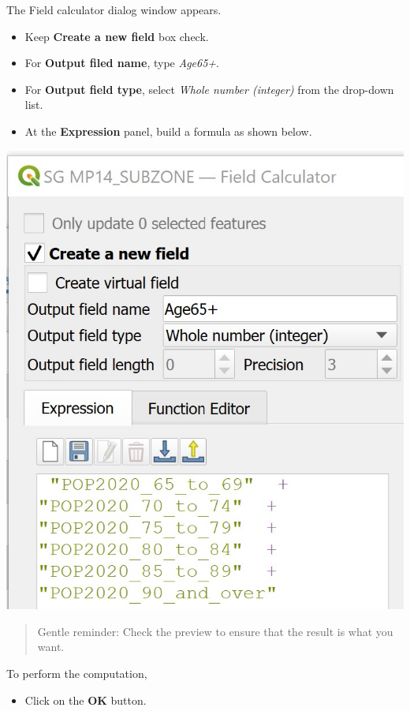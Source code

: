 \documentclass[
  letterpaper,
  DIV=11,
  numbers=noendperiod]{scrreprt}
\providecommand{\tightlist}{%
  \setlength{\itemsep}{0pt}\setlength{\parskip}{0pt}}\usepackage{longtable,booktabs,array}
\begin{document}
The Field calculator dialog window appears.

\begin{itemize}
\tightlist
\item
  Keep \textbf{Create a new field} box check.
\item
  For \textbf{Output filed name}, type \emph{Age65+}.
\item
  For \textbf{Output field type}, select \emph{Whole number (integer)}
  from the drop-down list.
\item
  At the \textbf{Expression} panel, build a formula as shown below.
\end{itemize}

\includegraphics{./img03/image30.jpg}

\begin{quote}
Gentle reminder: Check the preview to ensure that the result is what you
want.
\end{quote}

To perform the computation,

\begin{itemize}
\tightlist
\item
  Click on the \textbf{OK} button.
\end{itemize}
\end{document}

